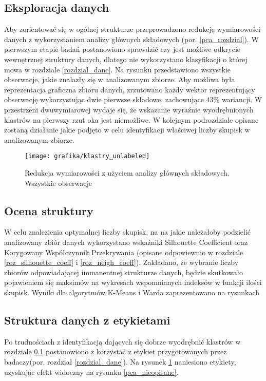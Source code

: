 \documentclass{article}
\begin{document}
\subsection{Eksploracja danych}
\label{roz_eksploracja_danych}
Aby zorientować się w ogólnej strukturze przeprowadzono redukcję wymiarowości danych z wykorzystaniem analizy głównych składowych (por. \ref{pca_rozdzial}).
W pierwszym etapie badań postanowiono sprawdzić czy jest możliwe odkrycie wewnętrznej struktury danych, dlatego nie wykorzystano klasyfikacji o której mowa w rozdziale \ref{rozdzial_dane}.
Na rysunku przedstawiono wszystkie obserwacje, jakie znalazły się w analizowanym zbiorze.  
Aby możliwa była reprezentacja graficzna zbioru danych, zrzutowano każdy wektor reprezentujący obserwację wykorzystując dwie pierwsze składowe, zachowujące $43\%$ wariancji.
W przestrzeni dwuwymiarowej wydaje się, że wskazanie wyraźnie wyodrębnionych klastrów na pierwszy rzut oka jest niemożliwe. 
W kolejnym podrozdziale opisane zostaną działanie jakie podjęto w celu identyfikacji właściwej liczby skupisk w analizowanym zbiorze.
\begin{figure}
\caption{Redukcja wymiarowości z użyciem analizy głównych składowych. Wszystkie obserwacje}
\label{rys_pca_unlabeled}
\texttt{[image: grafika/klastry\_unlabeled]}
\end{figure}


\subsection{Ocena struktury}
\label{roz_ocena_strukt}
W celu znalezienia optymalnej liczby skupisk, na na jakie należałoby podzielić analizowany zbiór danych wykorzystano wskaźniki Silhouette Coefficient oraz Korygowany Współczynnik Przekrywania (opisane odpowiewnio w rozdziale \ref{roz_silhouette_coeff} i \ref{roz_neigh_coeff}).
Zakładano, że wybranie liczby zbiorów odpowiadającej immanentnej strukturze danych, będzie skutkowało pojawieniem się maksimów na wykresach wspomnianych indeksów w funkcji ilości skupisk.
Wyniki dla algorytmów K-Means i Warda zaprezentowano na rysunkach %
\subsection{Struktura danych z etykietami}
Po trudnościach z identyfikacją dających się dobrze wyodrębnić klastrów w rozdziale \ref{roz_eksploracja_danych} postanowiono z korzystać z etykiet przygotowanych przez badaczy(por. rozdział \ref{rozdzial_dane}). Na rysunek \ref{rys_pca_unlabeled} naniesiono etykiety, uzyskując efekt widoczny na rysunku \ref{pca_nieopisane}.
\end{document}
